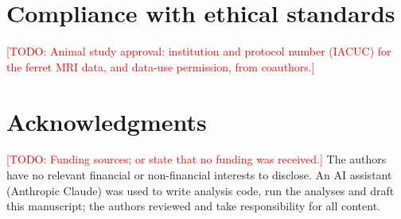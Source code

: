 \documentclass{article}
\newcommand{\todo}[1]{\textcolor{red}{[TODO: #1]}}
\begin{document}
\section{Compliance with ethical standards}
\label{sec:ethics}
\todo{Animal study approval: institution and protocol number (IACUC) for the ferret MRI data, and data-use permission, from coauthors.}

\section{Acknowledgments}
\label{sec:acknowledgments}
\todo{Funding sources; or state that no funding was received.} The authors have no relevant financial or non-financial interests to disclose. An AI assistant (Anthropic Claude) was used to write analysis code, run the analyses and draft this manuscript; the authors reviewed and take responsibility for all content.



\end{document}
